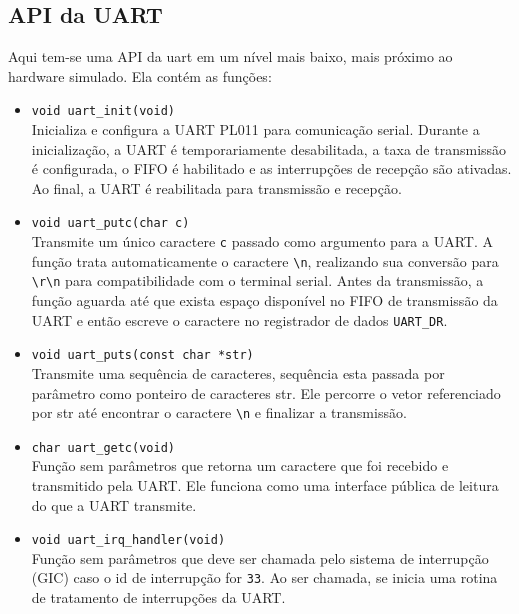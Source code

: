 \subsection{API da UART}
Aqui tem-se uma API da uart em um nível mais baixo, mais próximo ao hardware simulado. Ela contém as funções:
\begin{itemize}
    \item \texttt{void uart\_init(void)}\\
    Inicializa e configura a UART PL011 para comunicação serial. Durante a inicialização, a UART é temporariamente desabilitada, a taxa de transmissão é configurada, o FIFO é habilitado e as interrupções de recepção são ativadas. Ao final, a UART é reabilitada para transmissão e recepção.

    \item \texttt{void uart\_putc(char c)}\\
    Transmite um único caractere \texttt{c} passado como argumento para a UART. A função trata automaticamente o caractere \texttt{\textbackslash n}, realizando sua conversão para \texttt{\textbackslash r\textbackslash n} para compatibilidade com o terminal serial. Antes da transmissão, a função aguarda até que exista espaço disponível no FIFO de transmissão da UART e então escreve o caractere no registrador de dados \texttt{UART\_DR}. 

    \item \texttt{void uart\_puts(const char *str)}\\
    Transmite uma sequência de caracteres, sequência esta passada por parâmetro como ponteiro de caracteres str. Ele percorre o vetor referenciado por str até encontrar o caractere \texttt{\textbackslash n} e finalizar a transmissão.

    \item \texttt{char uart\_getc(void)}\\
    Função sem parâmetros que retorna um caractere que foi recebido e transmitido pela UART. Ele funciona como uma interface pública de leitura do que a UART transmite. 

    \item \texttt{void uart\_irq\_handler(void)}\\
    Função sem parâmetros que deve ser chamada pelo sistema de interrupção (GIC) caso o id de interrupção for \texttt{33}. Ao ser chamada, se inicia uma rotina de tratamento de interrupções da UART.
    
\end{itemize}

